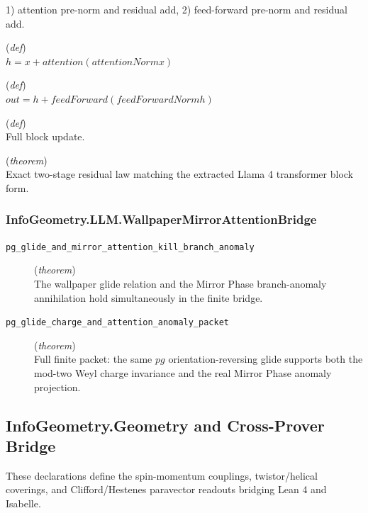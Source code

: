 \documentclass[11pt,a4paper]{article}
\begin{document}
\begin{description}
1) attention pre-norm and residual add, 
2) feed-forward pre-norm and residual add.
  \item[\texttt{afterAttention}] (\textit{def}) \\ $h = x + attention(attentionNorm x)$
  \item[\texttt{afterFeedForward}] (\textit{def}) \\ $out = h + feedForward(feedForwardNorm h)$
  \item[\texttt{run}] (\textit{def}) \\ Full block update.
  \item[\texttt{two\_stage\_residual\_block\_update}] (\textit{theorem}) \\ Exact two-stage residual law matching the extracted Llama 4 transformer block form.
\end{description}
\subsubsection*{InfoGeometry.LLM.WallpaperMirrorAttentionBridge}
\begin{description}
  \item[\texttt{pg\_glide\_and\_mirror\_attention\_kill\_branch\_anomaly}] (\textit{theorem}) \\ The wallpaper glide relation and the Mirror Phase branch-anomaly annihilation 
hold simultaneously in the finite bridge.
  \item[\texttt{pg\_glide\_charge\_and\_attention\_anomaly\_packet}] (\textit{theorem}) \\ Full finite packet: the same $pg$ orientation-reversing glide supports both 
the mod-two Weyl charge invariance and the real Mirror Phase anomaly projection.
\end{description}
\subsection{InfoGeometry.Geometry and Cross-Prover Bridge}
These declarations define the spin-momentum couplings, twistor/helical coverings, and Clifford/Hestenes paravector readouts bridging Lean 4 and Isabelle.
\end{document}
